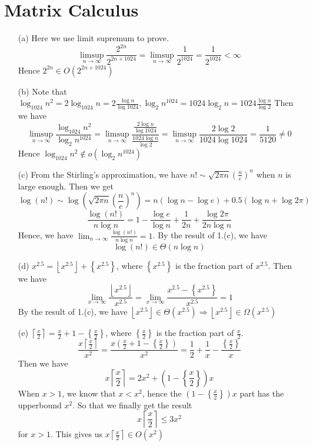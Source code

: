 \documentclass[12pt,a4paper]{article}
\begin{document}
\section{Matrix Calculus}    

\begin{enumerate}
    \item[(a)] 
        Here we use limit supremum to prove. 
        \[
            \limsup_{n\to\infty} \frac{2^{2n}}{2^{2n+1024}}=\limsup_{n\to\infty} \frac{1}{2^{1024}} = \frac{1}{2^{1024}} < \infty
        \]
        Hence $2^{2n}\in O(2^{2n+1024})$
    \item[(b)]
        Note that $\log_{1024}n^{2} = 2 \log_{1024} n = 2\frac{\log n}{\log 1024}, \log_{2}n^{1024} = 1024 \log_{2} n = 1024 \frac{\log n}{\log 2}$
        Then we have
        \[
            \limsup_{n\to\infty} \frac{\log_{1024}n^{2}}{\log_{2}n^{1024}} = \limsup_{n\to\infty} \frac{\frac{2\log n}{\log 1024}}{\frac{1024\log n}{\log 2}} = \limsup_{n\to\infty} \frac{2 \log 2}{1024 \log 1024} = \frac{1}{5120} \neq 0
        \]
        Hence $\log_{1024} n^{2} \notin o(\log_{2} n^{1024})$
    \item[(c)]
        From the Stirling's approximation, we have $n!\sim \sqrt{2\pi n}\left(\frac{n}{e}\right)^{n}$ when $n$ is large enough.
        Then we get 
        \[
            \log(n!) \sim \log\left(\sqrt{2\pi n}\left(\frac{n}{e}\right)^{n}\right) = n(\log n - \log e) + 0.5(\log {n} + \log 2\pi)
        \]
        \[
            \frac{\log(n!)}{n\log n} = 1 - \frac{\log e}{\log n} + \frac{1}{2n} + \frac{\log 2\pi}{2n\log n}
        \]
        Hence, we have $\lim_{n\to\infty} \frac{\log(n!)}{n\log n} = 1$.
        By the result of 1.(c), we have $$\log(n!) \in \Theta(n\log n)$$
    \item[(d)]
        $x^{2.5} = \left\lfloor x^{2.5}\right\rfloor + \left\{ x^{2.5}\right\} $, where $\left\{ x^{2.5}\right\} $ is the fraction part of $x^{2.5}$.
        Then we have
        \[
            \lim_{x\to\infty} \frac{\left\lfloor x^{2.5}\right\rfloor}{x^{2.5}} = \lim_{x\to\infty} \frac{x^{2.5} - \left\{ x^{2.5}\right\}}{x^{2.5}} = 1
        \]
        By the result of 1.(c), we have $\left\lfloor x^{2.5}\right\rfloor \in \Theta(x^{2.5})\Rightarrow \left\lfloor x^{2.5}\right\rfloor \in \Omega(x^{2.5})$
    \item[(e)]
        $\left\lceil \frac{x}{2}\right\rceil = \frac{x}{2} + 1 - \left\{ \frac{x}{2}\right\}$, where $\left\{ \frac{x}{2}\right\} $ is the fraction part of $\frac{x}{2}$.
        \[
            \frac{x\left\lceil \frac{x}{2}\right\rceil}{x^2} = \frac{x(\frac{x}{2} + 1 - \left\{ \frac{x}{2}\right\})}{x^2} = \frac{1}{2} + \frac{1}{x} - \frac{\left\{ \frac{x}{2}\right\}}{x}
        \]
        Then we have
        \[
            x\left\lceil \frac{x}{2}\right\rceil = 2x^2 + \left(1-\left\{\frac{x}{2}\right\} \right)x
        \]
        When $x>1$, we know that $x < x^2$, hence the $\left(1-\left\{\frac{x}{2}\right\} \right)x$ part has the upperbound $x^2$.
        So that we finally get the result
        \[
            x\left\lceil \frac{x}{2}\right\rceil \leq 3x^2 
        \]
        for $x>1$.
        This gives us $x\left\lceil \frac{x}{2}\right\rceil \in O(x^2)$
\end{enumerate}
\end{document}
